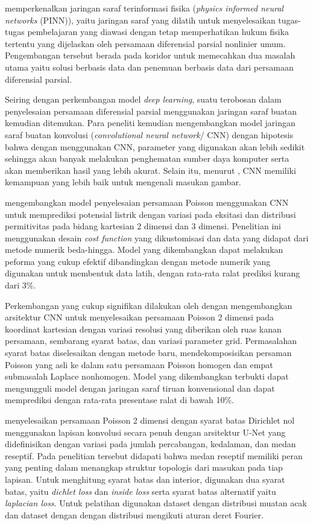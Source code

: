 \cite{DBLP:journals/corr/abs-1711-10561} memperkenalkan jaringan saraf terinformasi fisika (\emph{physics informed neural networks} (PINN)), yaitu jaringan saraf yang dilatih untuk menyelesaikan tugas-tugas pembelajaran yang diawasi dengan tetap memperhatikan hukum fisika tertentu yang dijelaskan oleh persamaan diferensial parsial nonlinier umum. Pengembangan tersebut berada pada koridor untuk memecahkan dua masalah utama yaitu solusi berbasis data dan penemuan berbasis data dari persamaan diferensial parsial.  

Seiring dengan perkembangan model \emph{deep learning}, suatu terobosan dalam penyelesaian persamaan diferensial parsial menggunakan jaringan saraf buatan kemudian ditemukan. Para peneliti kemudian mengembangkan model jaringan saraf buatan konvolusi (\emph{convolutional neural network}/ CNN) dengan hipotesis bahwa dengan menggunakan CNN, parameter yang digunakan akan lebih sedikit sehingga akan banyak melakukan penghematan sumber daya komputer serta akan memberikan hasil yang lebih akurat. Selain itu, menurut \cite{Li_Li_Gao}, CNN memiliki kemampuan yang lebih baik untuk mengenali masukan gambar.

\cite{shan_2020_study} mengembangkan model penyelesaian persamaan Poisson menggunakan CNN untuk memprediksi potensial listrik  dengan variasi pada eksitasi dan distribusi permitivitas pada bidang kartesian 2 dimensi dan 3 dimensi. Penelitian ini menggunakan desain \emph{cost function} yang dikustomisasi dan data yang didapat dari metode numerik beda-hingga. Model yang dikembangkan dapat melakukan peforma yang cukup efektif dibandingkan dengan metode numerik yang digunakan untuk membentuk data latih, dengan rata-rata ralat prediksi kurang dari 3\%.

Perkembangan yang cukup signifikan dilakukan oleh \cite{Ozbay2021} dengan mengembangkan arsitektur CNN untuk menyelesaikan persamaan Poisson 2 dimensi pada koordinat kartesian dengan variasi resolusi yang diberikan oleh ruas kanan persamaan, sembarang syarat batas, dan variasi parameter grid. Permasalahan syarat batas diselesaikan dengan metode baru, mendekomposisikan persaman Poisson yang asli ke dalam satu persamaan Poisson homogen dan empat submasalah Laplace nonhomogen. Model yang dikembangkan terbukti dapat mengungguli model dengan jaringan saraf tiruan konvensional dan dapat memprediksi dengan rata-rata presentase ralat di bawah 10\%. 

\cite{cheng2021using} menyelesaikan persamaan Poisson 2 dimensi dengan syarat batas Dirichlet nol menggunakan lapisan konvolusi secara penuh dengan arsitektur U-Net \citep{DBLP:journals/corr/RonnebergerFB15} yang didefinisikan dengan variasi pada jumlah percabangan, kedalaman, dan medan reseptif. Pada penelitian tersebut didapati bahwa medan reseptif memiliki peran yang penting dalam menangkap struktur topologis dari masukan pada tiap lapisan. Untuk menghitung syarat batas dan interior, digunakan dua syarat batas, yaitu \emph{dichlet loss} dan \emph{inside loss} serta syarat batas alternatif yaitu \emph{laplacian loss}. Untuk pelatihan digunakan dataset dengan distribusi muatan acak dan dataset dengan dengan distribusi mengikuti aturan deret Fourier.

